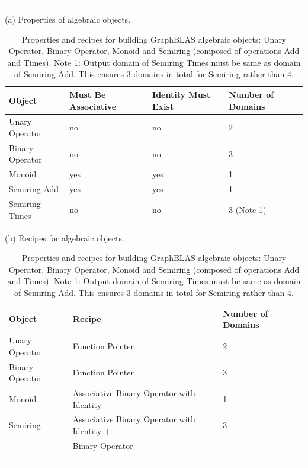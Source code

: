 \begin{table}
	\hrule
	\begin{center}
		\caption{Properties and recipes for building GraphBLAS algebraic objects: Unary Operator, Binary Operator, Monoid and Semiring (composed of operations Add and Times).\newline
			\hspace{\textwidth}Note 1: Output domain of Semiring Times must be same as domain of Semiring Add. This ensures 3 domains in total for Semiring rather than 4.}
		\label{Tab:Operator}
		
		\vspace{1\baselineskip}
		(a) Properties of algebraic objects.
		\vspace{1\baselineskip}
		
		\begin{tabular}{l|l|l|l}
			Object & Must Be Associative & Identity Must Exist & Number of Domains  \\
                        \hline
			Unary Operator & no & no & 2 \\
			Binary Operator & no & no & 3  \\
			Monoid & yes & yes & 1  \\
			Semiring Add & yes & yes  & 1  \\
			Semiring Times & no & no & 3  (Note 1) \\
		\end{tabular}
		
		\vspace{1\baselineskip}
		(b) Recipes for algebraic objects.
		\vspace{1\baselineskip}
		
		\begin{tabular}{l|l|l}
			Object          & Recipe                & Number of Domains  \\ 
                        \hline
			Unary Operator  & Function Pointer      & 2 \\				
			Binary Operator & Function Pointer      & 3  \\	
			Monoid          & Associative Binary Operator with Identity & 1  \\
			Semiring        & Associative Binary Operator with Identity $+$ &3 \\
                                        & Binary Operator &  \\
                        
		\end{tabular}
		
	\end{center}
	\hrule
\end{table}

